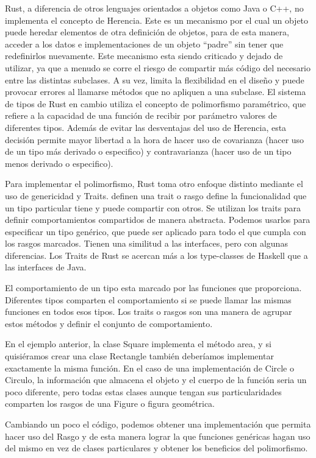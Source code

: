 Rust, a diferencia de otros lenguajes orientados a objetos como Java o C++, no implementa el concepto de Herencia. Este es un mecanismo por el cual un objeto puede heredar elementos de otra definición de objetos, para de esta manera, acceder a los datos e implementaciones de un objeto ``padre'' sin tener que redefinirlos nuevamente.
Este mecanismo esta siendo criticado y dejado de utilizar, ya que a menudo se corre el riesgo de compartir más código del necesario entre las distintas subclases. A su vez, limita la flexibilidad en el diseño y puede provocar errores al llamarse métodos que no apliquen a una subclase.
El sistema de tipos de Rust en cambio utiliza el concepto de polimorfismo paramétrico, que refiere a la capacidad de una función de recibir por parámetro valores de diferentes tipos. Además de evitar las desventajas del uso de Herencia, esta decisión permite mayor libertad a la hora de hacer uso de covarianza (hacer uso de un tipo más derivado o especifico) y contravarianza (hacer uso de un tipo menos derivado o especifico).

Para implementar el polimorfismo, Rust toma otro enfoque distinto mediante el uso de genericidad y Traits. \cite{rustbook} definen una trait o rasgo define la funcionalidad que un tipo particular tiene y puede compartir con otros. Se utilizan los traits para definir comportamientos compartidos de manera abstracta. Podemos usarlos para especificar un tipo genérico, que puede ser aplicado para todo el que cumpla con los rasgos marcados. Tienen una similitud a las interfaces, pero con algunas diferencias. Los Traits de Rust se acercan más a los type-classes de Haskell que a las interfaces de Java.

El comportamiento de un tipo esta marcado por las funciones que proporciona. Diferentes tipos comparten el comportamiento si se puede llamar las mismas funciones en todos esos tipos. Los traits o rasgos son una manera de agrupar estos métodos y definir el conjunto de comportamiento.

En el ejemplo anterior, la clase Square implementa el método area, y si quisiéramos crear una clase Rectangle también deberíamos implementar exactamente la misma función. En el caso de una implementación de Circle o Circulo, la información que almacena el objeto y el cuerpo de la función \textit{} seria un poco diferente, pero todas estas clases aunque tengan sus particularidades comparten los rasgos de una Figure o figura geométrica.

Cambiando un poco el código, podemos obtener una implementación que permita hacer uso del Rasgo y de esta manera lograr la que funciones genéricas hagan uso del mismo en vez de clases particulares y obtener los beneficios del polimorfismo.


